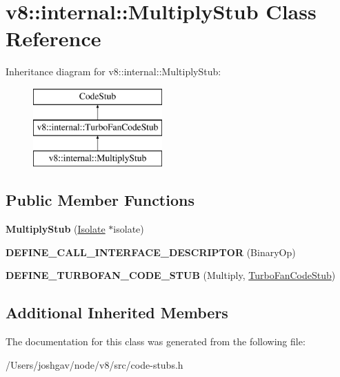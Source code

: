 \hypertarget{classv8_1_1internal_1_1_multiply_stub}{}\section{v8\+:\+:internal\+:\+:Multiply\+Stub Class Reference}
\label{classv8_1_1internal_1_1_multiply_stub}
Inheritance diagram for v8\+:\+:internal\+:\+:Multiply\+Stub\+:\begin{figure}[H]
\begin{center}
\leavevmode
\includegraphics[height=3.000000cm]{classv8_1_1internal_1_1_multiply_stub}
\end{center}
\end{figure}
\subsection*{Public Member Functions}
\begin{DoxyCompactItemize}
\item 
{\bfseries Multiply\+Stub} (\hyperlink{classv8_1_1internal_1_1_isolate}{Isolate} $\ast$isolate)\hypertarget{classv8_1_1internal_1_1_multiply_stub_ac8ea9cba22dc1c129d559a84c25b7370}{}\label{classv8_1_1internal_1_1_multiply_stub_ac8ea9cba22dc1c129d559a84c25b7370}

\item 
{\bfseries D\+E\+F\+I\+N\+E\+\_\+\+C\+A\+L\+L\+\_\+\+I\+N\+T\+E\+R\+F\+A\+C\+E\+\_\+\+D\+E\+S\+C\+R\+I\+P\+T\+OR} (Binary\+Op)\hypertarget{classv8_1_1internal_1_1_multiply_stub_a5f9f611da8ecd4e8c5c301d2ca1d3de6}{}\label{classv8_1_1internal_1_1_multiply_stub_a5f9f611da8ecd4e8c5c301d2ca1d3de6}

\item 
{\bfseries D\+E\+F\+I\+N\+E\+\_\+\+T\+U\+R\+B\+O\+F\+A\+N\+\_\+\+C\+O\+D\+E\+\_\+\+S\+T\+UB} (Multiply, \hyperlink{classv8_1_1internal_1_1_turbo_fan_code_stub}{Turbo\+Fan\+Code\+Stub})\hypertarget{classv8_1_1internal_1_1_multiply_stub_a4c96ab3d205a0c926ee47c4980cea798}{}\label{classv8_1_1internal_1_1_multiply_stub_a4c96ab3d205a0c926ee47c4980cea798}

\end{DoxyCompactItemize}
\subsection*{Additional Inherited Members}


The documentation for this class was generated from the following file\+:\begin{DoxyCompactItemize}
\item 
/\+Users/joshgav/node/v8/src/code-\/stubs.\+h\end{DoxyCompactItemize}
